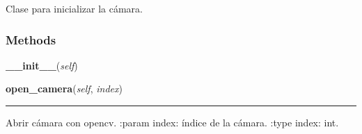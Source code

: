     \label{src:camera:Camera}
Clase para inicializar la cámara.



  \subsubsection{Methods}

    \label{src:camera:Camera:__init__}

    \vspace{0.5ex}

\hspace{.8\funcindent}\begin{boxedminipage}{\funcwidth}

    \raggedright \textbf{\_\_init\_\_}(\textit{self})

\setlength{\parskip}{2ex}
\setlength{\parskip}{1ex}
    \end{boxedminipage}

    \label{src:camera:Camera:open_camera}

    \vspace{0.5ex}

\hspace{.8\funcindent}\begin{boxedminipage}{\funcwidth}

    \raggedright \textbf{open\_camera}(\textit{self}, \textit{index})

    \vspace{-1.5ex}

    \rule{\textwidth}{0.5\fboxrule}
\setlength{\parskip}{2ex}
    Abrir cámara con opencv. :param index: índice de la cámara. :type 
    index: int.

\setlength{\parskip}{1ex}
    \end{boxedminipage}

    \label{src:camera:Camera:get_frame}

